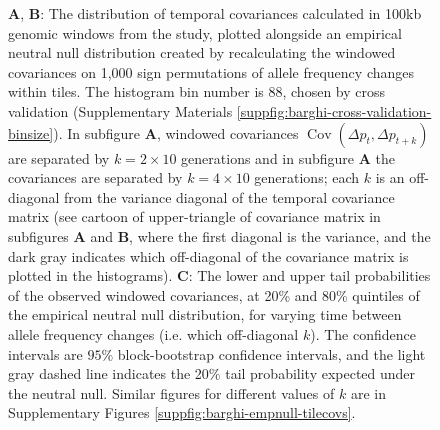 \documentclass[11pt]{article}
\DeclareMathOperator{\cov}{Cov}
\begin{document}
\begin{figure}
  \caption{\footnotesize {\bf A}, {\bf B}: The distribution of temporal
    covariances calculated in 100kb genomic windows from the
    \textcite{Barghi2019-qy} study, plotted alongside an empirical neutral null
    distribution created by recalculating the windowed covariances on 1,000
    sign permutations of allele frequency changes within tiles. The histogram
    bin number is 88, chosen by cross validation (Supplementary Materials
    \ref{suppfig:barghi-cross-validation-binsize}). In subfigure {\bf A},
    windowed covariances $\cov(\Delta p_t, \Delta p_{t+k})$ are separated by
    $k=2 \times 10$ generations and in subfigure {\bf A} the covariances are
    separated by $k=4 \times 10$ generations; each $k$ is an off-diagonal from
    the variance diagonal of the temporal covariance matrix (see cartoon of
    upper-triangle of covariance matrix in subfigures {\bf A} and {\bf B},
    where the first diagonal is the variance, and the dark gray indicates which
    off-diagonal of the covariance matrix is plotted in the histograms). {\bf
    C}: The lower and upper tail probabilities of the observed windowed
    covariances, at 20\% and 80\% quintiles of the empirical neutral null
    distribution, for varying time between allele frequency changes (i.e. which
    off-diagonal $k$). The confidence intervals are  $95\%$ block-bootstrap
  confidence intervals, and the light gray dashed line indicates the 20\% tail
probability expected under the neutral null. Similar figures for different
values of $k$ are in Supplementary Figures
\ref{suppfig:barghi-empnull-tilecovs}. }

    \label{fig:figure-3} 
\end{figure}
\end{document}
